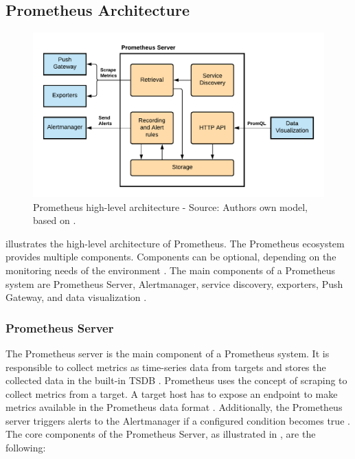 \subsection{Prometheus Architecture}
\begin{figure}[h]
\centering
\includegraphics[scale=0.8]{images/04_technical_background/prometheus/prometheus_architecture}
\caption{Prometheus high-level architecture - Source: Authors own model, based on \cite{Prom2020Docs, Brazil2018Prom}.}
\label{fig:prom_architecture}
\end{figure}

 illustrates the high-level architecture of Prometheus.
The Prometheus ecosystem provides multiple components. Components can be optional, depending on the monitoring needs of the environment \cite{Bastos2019Prom}. The main components of a Prometheus system are Prometheus Server, Alertmanager, service discovery, exporters, Push Gateway, and data visualization \cite{Prom2020Docs}.

\subsubsection{Prometheus Server}
The Prometheus server is the main component of a Prometheus system. It is responsible to collect metrics as time-series data from targets and stores the collected data in the built-in TSDB \cite{Bastos2019Prom}. Prometheus uses the concept of scraping to collect metrics from a target. A target host has to expose an endpoint to make metrics available in the Prometheus data format \cite{Pandey2020Monitoring}. Additionally, the Prometheus server triggers alerts to the Alertmanager if a configured condition becomes true \cite{Prom2020Docs}.
The core components of the Prometheus Server, as illustrated in , are the following:

